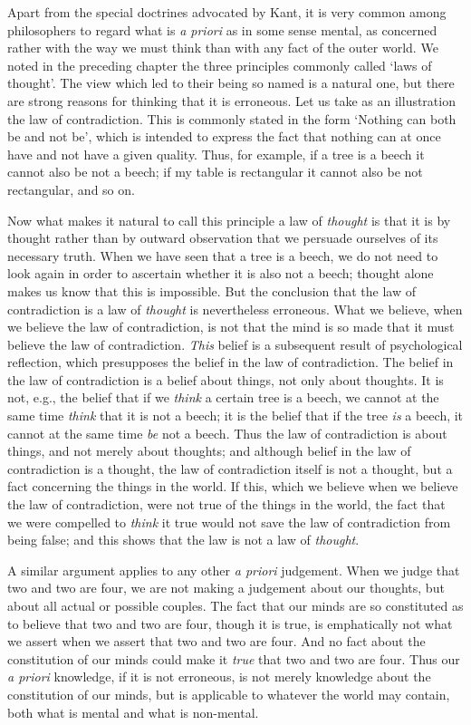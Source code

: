 \documentclass[oneside,letterpaper,12pt]{book}
\begin{document}
Apart from the special doctrines advocated by Kant, it is very common
among philosophers to regard what is \emph{a priori} as in some sense
mental, as concerned rather with the way we must think than with any
fact of the outer world. We noted in the preceding chapter the three
principles commonly called `laws of
thought'. The view which led to their being so named is a
natural one, but there are strong reasons for thinking that it is
erroneous. Let us take as an illustration the law of contradiction. This
is commonly stated in the form `Nothing can both be and
not be', which is intended to express the fact that
nothing can at once have and not have a given quality. Thus, for
example, if a tree is a beech it cannot also be not a beech; if my table
is rectangular it cannot also be not rectangular, and so on.

Now what makes it natural to call this principle a law of \emph{thought}
is that it is by thought rather than by outward observation that we
persuade ourselves of its necessary truth. When we have seen that a tree
is a beech, we do not need to look again in order to ascertain whether
it is also not a beech; thought alone makes us know that this is
impossible. But the conclusion that the law of contradiction is a law of
\emph{thought} is nevertheless erroneous. What we believe, when we
believe the law of contradiction, is not that the mind is so made that
it must believe the law of contradiction. \emph{This} belief is a
subsequent result of psychological reflection, which presupposes the
belief in the law of contradiction. The belief in the law of
contradiction is a belief about things, not only about thoughts. It is
not, e.g., the belief that if we \emph{think} a certain tree is a beech,
we cannot at the same time \emph{think} that it is not a beech; it is
the belief that if the tree \emph{is} a beech, it cannot at the same
time \emph{be} not a beech. Thus the law of contradiction is about
things, and not merely about thoughts; and although belief in the law of
contradiction is a thought, the law of contradiction itself is not a
thought, but a fact concerning the things in the world. If this, which
we believe when we believe the law of contradiction, were not true of
the things in the world, the fact that we were compelled to \emph{think}
it true would not save the law of contradiction from being false; and
this shows that the law is not a law of \emph{thought}.

A similar argument applies to any other \emph{a priori} judgement. When
we judge that two and two are four, we are not making a judgement about
our thoughts, but about all actual or possible couples. The fact that
our minds are so constituted as to believe that two and two are four,
though it is true, is emphatically not what we assert when we assert
that two and two are four. And no fact about the constitution of our
minds could make it \emph{true} that two and two are four. Thus our
\emph{a priori} knowledge, if it is not erroneous, is not merely
knowledge about the constitution of our minds, but is applicable to
whatever the world may contain, both what is mental and what is
non-mental.
\end{document}

